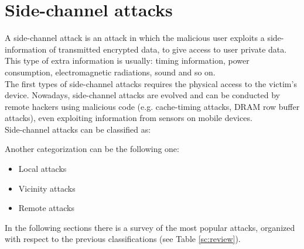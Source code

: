 \chapter{Side-channel attacks}\label{chapter:SideCH}
A side-channel attack is an attack in which the malicious user exploits a side-information of transmitted encrypted data, to give access to user private data. 
This type of extra information is usually: timing information, power consumption, electromagnetic radiations, sound and so on.\\
The first types of side-channel attacks requires the physical access to the victim's device. Nowadays, side-channel attacks are evolved and can be conducted by remote hackers using malicious code (e.g. cache-timing attacks, DRAM row buffer attacks), even exploiting information from sensors on mobile devices\cite{side_classification}.\\
Side-channel attacks can be classified as:
\begin{itemize}
\end{itemize}
Another categorization can be the following one:
\begin{itemize}
\item{Local attacks}
\item{Vicinity attacks}
\item{Remote attacks}
\end{itemize}
In the following sections there is a survey of the most popular attacks, organized with respect to the previous classifications (see Table \ref{sc:review}). 

